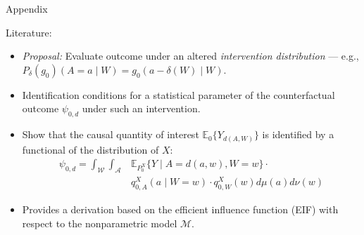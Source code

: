 \documentclass{beamer}
\newcommand{\E}{\mathbb{E}}
\begin{document}

\appendix
\begin{frame}[standout]
  Appendix
\end{frame}


\begin{frame}[c]{Literature: \cite{diaz2012population}}

\begin{center}
\begin{itemize}
  \itemsep10pt
  \item \textit{Proposal:} Evaluate outcome under an altered
    \textit{intervention distribution} --- e.g.,
    $P_{\delta}(g_0)(A = a \mid W) = g_0(a - \delta(W) \mid W)$.
  \item Identification conditions for a statistical parameter of the
    counterfactual outcome $\psi_{0,d}$ under such an intervention.
  \item Show that the causal quantity of interest $\E_0 \{Y_{d(A, W)}\}$ is
    identified by a functional of the distribution of $X$:
    \begin{align*}\label{eqn:identification2012}
      \psi_{0,d} = \int_{\mathcal{W}} \int_{\mathcal{A}} &\E_{P_0^X} \{Y \mid
        A = d(a, w), W = w\} \cdot \\ &q_{0, A}^X(a \mid W = w) \cdot
        q_{0, W}^X(w) d\mu(a)d\nu(w)
    \end{align*}
  \item Provides a derivation based on the efficient influence function (EIF)
    with respect to the nonparametric model $\mathcal{M}$.
\end{itemize}
\end{center}


\end{frame}
\end{document}
